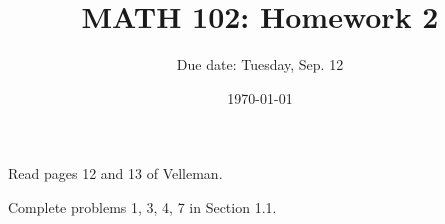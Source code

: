 \documentclass[12pt]{amsart}
\title{ MATH 102: Homework 2}
\author{Due date: Tuesday, Sep. 12}
\date{\today}
\begin{document}
\maketitle

Read pages 12 and 13 of Velleman.

Complete problems 1, 3, 4, 7 in Section 1.1.



\printbibliography 
%
%
\end{document}
